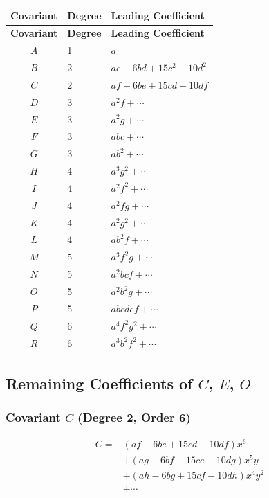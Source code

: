 \documentclass[11pt,a4paper]{book}
\begin{document}
\begin{center}
\small
\begin{longtable}{|c|l|l|}
\hline
\textbf{Covariant} & \textbf{Degree} & \textbf{Leading Coefficient} \\
\hline
\endfirsthead
\hline
\textbf{Covariant} & \textbf{Degree} & \textbf{Leading Coefficient} \\
\hline
\endhead
\hline
\endfoot
$A$ & 1 & $a$ \\
$B$ & 2 & $ae - 6bd + 15c^2 - 10d^2$ \\
$C$ & 2 & $af - 6be + 15cd - 10df$ \\
$D$ & 3 & $a^2f + \dotsb$ \\
$E$ & 3 & $a^2g + \dotsb$ \\
$F$ & 3 & $abc + \dotsb$ \\
$G$ & 3 & $ab^2 + \dotsb$ \\
$H$ & 4 & $a^3g^2 + \dotsb$ \\
$I$ & 4 & $a^2f^2 + \dotsb$ \\
$J$ & 4 & $a^2fg + \dotsb$ \\
$K$ & 4 & $a^2g^2 + \dotsb$ \\
$L$ & 4 & $ab^2f + \dotsb$ \\
$M$ & 5 & $a^3f^2g + \dotsb$ \\
$N$ & 5 & $a^2bcf + \dotsb$ \\
$O$ & 5 & $a^2b^2g + \dotsb$ \\
$P$ & 5 & $abcdef + \dotsb$ \\
$Q$ & 6 & $a^4f^2g^2 + \dotsb$ \\
$R$ & 6 & $a^3b^2f^2 + \dotsb$ \\
\hline
\end{longtable}
\end{center}

\subsection*{Remaining Coefficients of $C$, $E$, $O$}

\subsubsection*{Covariant $C$ (Degree 2, Order 6)}

\[
\begin{aligned}
C ={}& (af - 6be + 15cd - 10df)x^6 \\
& + (ag - 6bf + 15ce - 10dg)x^5y \\
& + (ah - 6bg + 15cf - 10dh)x^4y^2 \\
& + \dotsb
\end{aligned}
\]
\end{document}
